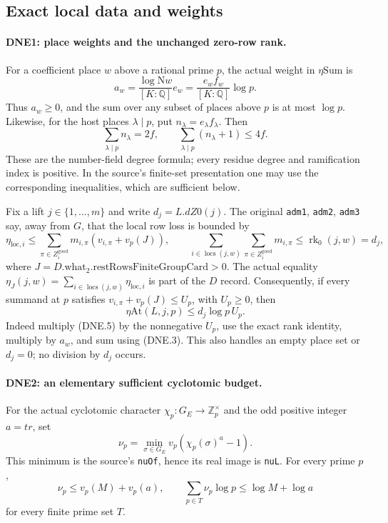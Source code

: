 \subsection{Exact local data and weights}

\paragraph{DNE1: place weights and the unchanged zero-row rank.}
\label{claim:DNE1}
For a coefficient place $w$ above a rational prime $p$, the actual
weight in $\eta\mathrm{Sum}$ is
\[
 a_w=\frac{\log \mathrm Nw}{[K:\mathbb Q]}e_w
     =\frac{e_w f_w}{[K:\mathbb Q]}\log p.                 \tag{DNE.3}
\]
Thus $a_w\ge0$, and the sum over any subset of places above $p$
is at most $\log p$.  Likewise, for the host places $\lambda\mid p$,
put $n_\lambda=e_\lambda f_\lambda$.  Then
\[
 \sum_{\lambda\mid p}n_\lambda=2f,\qquad
 \sum_{\lambda\mid p}(n_\lambda+1)\le4f.                 \tag{DNE.4}
\]
These are the number-field degree formula; every residue degree
and ramification index is positive.  In the source's finite-set
presentation one may use the corresponding inequalities, which
are sufficient below.

Fix a lift $j\in\{1,\ldots,m\}$ and write $d_j=L.dZ0(j)$.
The original \texttt{adm1}, \texttt{adm2}, \texttt{adm3} say,
away from $G$, that the local row loss is bounded by
\[
 \eta_{\mathrm{loc},i}\le
    \sum_{\pi\in Z_i^{\mathrm{good}}}
         m_{i,\pi}(v_{i,\pi}+v_p(J)),\qquad
 \sum_{i\in\operatorname{locs}(j,w)}
    \sum_{\pi\in Z_i^{\mathrm{good}}}m_{i,\pi}
 \le \operatorname{rk}_0(j,w)=d_j,                       \tag{DNE.5}
\]
where $J=D.\mathrm{what}_2.\mathrm{restRowsFiniteGroupCard}>0$.
The actual equality
$\eta_J(j,w)=\sum_{i\in\operatorname{locs}(j,w)}\eta_{\mathrm{loc},i}$
is part of the $D$ record.  Consequently, if every summand at $p$
satisfies $v_{i,\pi}+v_p(J)\le U_p$, with $U_p\ge0$, then
\[
 \eta\mathrm{At}(L,j,p)\le d_j\log p\,U_p.              \tag{DNE.6}
\]
Indeed multiply (DNE.5) by the nonnegative $U_p$, use the exact rank
identity, multiply by $a_w$, and sum using (DNE.3).  This also
handles an empty place set or $d_j=0$; no division by $d_j$ occurs.

\paragraph{DNE2: an elementary sufficient cyclotomic budget.}
\label{claim:DNE2}
For the actual cyclotomic character $\chi_p:G_E\to\mathbb Z_p^\times$
and the odd positive integer $a=tr$, set
\[
 \nu_p=\min_{\sigma\in G_E}v_p(\chi_p(\sigma)^a-1).
\]
This minimum is the source's \texttt{nuOf}, hence its real image is
\texttt{nuL}.  For every prime $p$,
\[
 \nu_p\le v_p(M)+v_p(a),\qquad
 \sum_{p\in T}\nu_p\log p\le\log M+\log a              \tag{DNE.7}
\]
for every finite prime set $T$.

